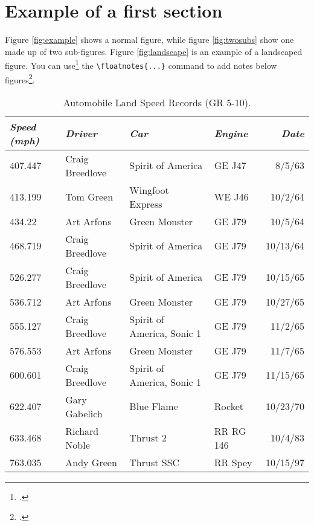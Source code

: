 \documentclass{cup-ino}
\begin{document}
\section{Example of a first section}

Figure \ref{fig:example} shows a normal figure, while figure \ref{fig:twosubs} show one made up of two sub-figures. Figure \ref{fig:landscape} is an example of a landscaped figure. You can use\footcite{simmons:2014} the \verb|\floatnotes{...}| command to add notes below figures\footcite{halimi:1990}.

\begin{table}
\caption{Automobile Land Speed Records (GR 5-10).}\label{tab:example}

\begin{tabular}{@{} l l l l r @{}}
\toprule
\emph{Speed (mph)} & \emph{Driver} & \emph{Car} & \emph{Engine} & \emph{Date}     \\
\midrule[\heavyrulewidth] %
407.447     & Craig Breedlove & Spirit of America          & GE J47    & 8/5/63   \\
413.199     & Tom Green       & Wingfoot Express           & WE J46    & 10/2/64  \\
434.22      & Art Arfons      & Green Monster              & GE J79    & 10/5/64  \\
468.719     & Craig Breedlove & Spirit of America          & GE J79    & 10/13/64 \\
526.277     & Craig Breedlove & Spirit of America          & GE J79    & 10/15/65 \\
536.712     & Art Arfons      & Green Monster              & GE J79    & 10/27/65 \\
555.127     & Craig Breedlove & Spirit of America, Sonic 1 & GE J79    & 11/2/65  \\
576.553     & Art Arfons      & Green Monster              & GE J79    & 11/7/65  \\
600.601     & Craig Breedlove & Spirit of America, Sonic 1 & GE J79    & 11/15/65 \\
622.407     & Gary Gabelich   & Blue Flame                 & Rocket    & 10/23/70 \\
633.468     & Richard Noble   & Thrust 2                   & RR RG 146 & 10/4/83  \\
763.035     & Andy Green      & Thrust SSC                 & RR Spey   & 10/15/97\\
\bottomrule
\end{tabular}


\end{table}
\end{document}
